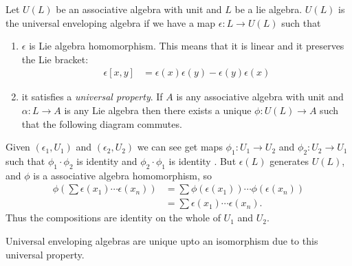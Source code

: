 Let $U(L)$ be an associative algebra with unit and $L$ be a lie algebra. $U(L)$ is the universal enveloping algebra if we have a map $\epsilon: L\to U(L)$ such that
\begin{enumerate}
    \makethislistcompact
    \item $\epsilon$ is Lie algebra homomorphism. This means that it is linear and it preserves the Lie bracket:
        \begin{align}
            \epsilon[x,y] &= \epsilon(x)\epsilon(y) - \epsilon(y) \epsilon(x)
        \end{align}
    \item it satisfies a \emph{universal property}. If $A$ is any associative algebra with unit and $\alpha: L \to A $ is any Lie algebra then there exists a unique $\phi: U(L)\to A$ such that the following diagram commutes.
        \begin{center}
        \end{center}
\end{enumerate}
\begin{insight}
    Given $(\epsilon_1, U_1)$ and $(\epsilon_2,U_2)$ we can see get maps $\phi_1: U_1\to U_2$  and $\phi_2: U_2\to U_1$ such that 
    $\phi_1\cdot\phi_2$ is identity  and 
    $\phi_2\cdot\phi_1$ is identity . 
    But $\epsilon(L)$ generates $U(L)$, and $\phi$ is a associative algebra homomorphism, so 
    \begin{align}
        \phi\left(\sum \epsilon(x_1)\cdots\epsilon(x_n)\right) &= \sum \phi(\epsilon(x_1))\cdots\phi(\epsilon(x_n))\\
            &= \sum \epsilon(x_1)\cdots\epsilon(x_n).
    \end{align}
    Thus the compositions are identity on the whole of $U_1$ and $U_2$.
    
\end{insight}
Universal enveloping algebras are unique upto an isomorphism due to this universal property.


